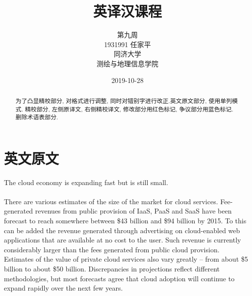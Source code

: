 \documentclass[a4paper, UTF8, 12pt]{article}
\begin{document}
\title{\Huge 英译汉课程}
\author{\Large 
        第九周 \\[12pt]
        1931991 任家平 \\[12pt]
        同济大学 \\[12pt]
        测绘与地理信息学院}
\date{2019-10-28}

\maketitle


\begin{abstract}
    为了凸显精校部分, 对格式进行调整, 同时对错别字进行改正.英文原文部分, 使用单列模式. 精校部分, 左侧原译文, 右侧精校译文, 修改部分用红色标记, 争议部分用蓝色标记. 删除术语表部分.
\end{abstract}


\thispagestyle{empty}

\newpage
{}
\tableofcontents
{}

\newpage
{}

\section{英文原文}
\paragraph*{}
    \begin{bfseries}
        \large 
        The cloud economy is expanding fast but is still small.
    \end{bfseries}

\paragraph*{}
    There are various estimates of the size of the market for cloud services. Fee-generated revenues from public provision of IaaS, PaaS and SaaS have been forecast to reach somewhere between \$43 billion and \$94 billion by 2015. To this can be added the revenue generated through advertising on cloud-enabled web applications that are available at no cost to the user. Such revenue is currently considerably larger than the fees generated from public cloud provision. Estimates of the value of private cloud services also vary greatly – from about \$5 billion to about \$50 billion. Discrepancies in projections reflect different methodologies, but most forecasts agree that cloud adoption will continue to expand rapidly over the next few years.
\end{document}
